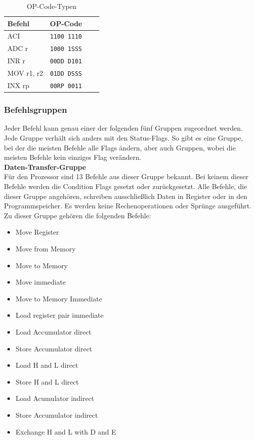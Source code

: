 \documentclass[12pt]{article}
\begin{document}
\begin{table}[h]
\centering
\begin{tabular}{|l|c|c|c| } 
 \hline
 Befehl & OP-Code \\
 \hline 
 ACI & \texttt{1100 1110} \\ 
 ADC r & \texttt{1000 1SSS} \\
 INR r & \texttt{00DD D101} \\
 MOV r1, r2 & \texttt{01DD DSSS} \\
 INX rp & \texttt{00RP 0011} \\
 \hline
\end{tabular}
\caption{OP-Code-Typen \cite{IntMan30}}
\label{table:opcode}
\end{table}

\subsubsection{Befehlsgruppen}
Jeder Befehl kann genau einer der folgenden fünf Gruppen zugeordnet werden. Jede Gruppe verhält sich anders mit den Status-Flags. So gibt es eine Gruppe, bei der die meisten Befehle alle Flags ändern, aber auch Gruppen, wobei die meisten Befehle kein einziges Flag verändern.
\\

\noindent
\textbf{Daten-Transfer-Gruppe}\\
Für den Prozessor sind 13 Befehle aus dieser Gruppe bekannt. Bei keinem dieser Befehle werden die Condition Flags gesetzt oder zurückgesetzt. Alle Befehle, die dieser Gruppe angehören, schreiben ausschließlich Daten in Register oder in den Programmspeicher. Es werden keine Rechenoperationen oder Sprünge ausgeführt. Zu dieser Gruppe gehören die folgenden Befehle:

\begin{multicols}{2}
\begin{itemize}
\item Move Register
\item Move from Memory
\item Move to Memory
\item Move immediate
\item Move to Memory Immediate
\item Load register pair immediate
\item Load Accumulator direct
\item Store Accumulator direct
\item Load H and L direct
\item Store H and L direct
\item Load Acumulator indirect
\item Store Accumulator indirect
\item Exchange H and L with D and E
\end{itemize}
\end{multicols}
\end{document}
